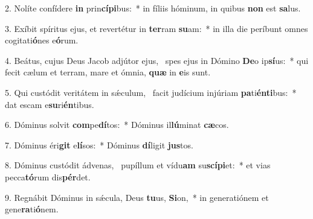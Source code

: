 2. Nolíte confídere \textbf{in} prin\textbf{cí}\textbf{pi}bus:~*  in fíliis hóminum, in quibus \textbf{non} est \textbf{sa}lus.\

3. Exíbit spíritus ejus, et revertétur in \textbf{ter}ram \textbf{su}am:~*  in illa die períbunt omnes cogitati\textbf{ó}nes e\textbf{ó}rum.\

4. Beátus, cujus Deus Jacob adjútor ejus, \dag\  spes ejus in Dómino \textbf{De}o ip\textbf{sí}us:~*  qui fecit cælum et terram, mare et ómnia, \textbf{quæ} in \textbf{e}is sunt.\

5. Qui custódit veritátem in sǽculum, \dag\  facit judícium injúriam \textbf{pa}ti\textbf{én}\textbf{ti}bus:~*  dat escam e\textbf{su}ri\textbf{én}tibus.\

6. Dóminus solvit \textbf{com}pe\textbf{dí}tos:~*  Dóminus il\textbf{lú}minat \textbf{cæ}cos.\

7. Dóminus éri\textbf{git} e\textbf{lí}sos:~*  Dóminus \textbf{dí}ligit \textbf{jus}tos.\

8. Dóminus custódit ádvenas, \dag\  pupíllum et vídu\textbf{am} su\textbf{scí}\textbf{pi}et:~*  et vias pecca\textbf{tó}rum dis\textbf{pér}det.\

9. Regnábit Dóminus in sǽcula, Deus \textbf{tu}us, \textbf{Si}on,~*  in generatiónem et gene\textbf{ra}ti\textbf{ó}nem.\

